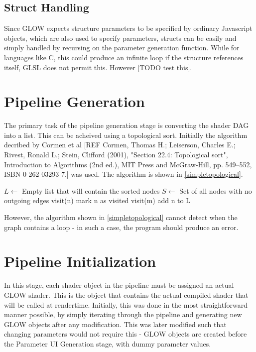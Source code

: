\documentclass[12pt,twoside,notitlepage]{report}
\begin{document}
\subsection{Struct Handling}
Since GLOW expects structure parameters to be specified by ordinary Javascript objects, which are also used to specify parameters, structs can be easily and simply handled by recursing on the parameter generation function. While for languages like C, this could produce an infinite loop if the structure references itself, GLSL does not permit this. However [TODO test this].

\section{Pipeline Generation}
The primary task of the pipeline generation stage is converting the shader DAG into a list. This can be acheived using a topological sort. Initially the algorithm decribed by Cormen et al [REF 
Cormen, Thomas H.; Leiserson, Charles E.; Rivest, Ronald L.; Stein, Clifford (2001), "Section 22.4: Topological sort", Introduction to Algorithms (2nd ed.), MIT Press and McGraw-Hill, pp. 549–552, ISBN 0-262-03293-7.] was used. The algorithm is shown in \ref{simpletopological}.
\begin{algorithmic}
\label{simpletopological}
\State $L \gets $ Empty list that will contain the sorted nodes
\State $S \gets $ Set of all nodes with no outgoing edges
    visit(n)
\EndFor 
{}
        mark n as visited
            visit(m)
        \EndFor
        add n to L
    \EndIf
\EndFunction
\end{algorithmic}
However, the algorithm shown in \ref{simpletopological} cannot detect when the graph contains a loop - in such a case, the program should produce an error.

\section{Pipeline Initialization}
In this stage, each shader object in the pipeline must be assigned an actual GLOW shader. This is the object that contains the actual compiled shader that will be called at rendertime. Initially, this was done in the most straightforward manner possible, by simply iterating through the pipeline and generating new GLOW objects after any modification. This was later modified such that changing parameters would not require this - GLOW objects are created before the Parameter UI Generation stage, with dummy parameter values. 
\end{document}
